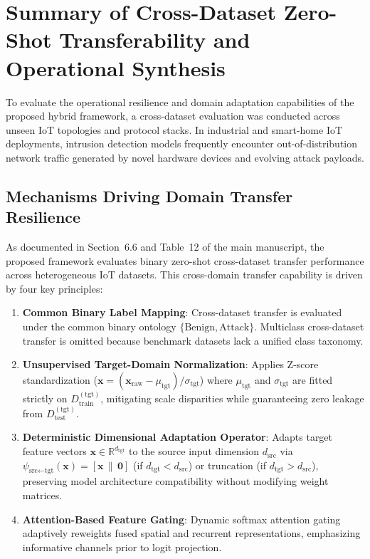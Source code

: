 \documentclass[a4paper,fleqn]{cas-sc}
\begin{document}
\section{Summary of Cross-Dataset Zero-Shot Transferability and Operational Synthesis}
\label{sec:supp_cross_dataset}

To evaluate the operational resilience and domain adaptation capabilities of the proposed hybrid framework, a cross-dataset evaluation was conducted across unseen IoT topologies and protocol stacks. In industrial and smart-home IoT deployments, intrusion detection models frequently encounter out-of-distribution network traffic generated by novel hardware devices and evolving attack payloads.

\subsection{Mechanisms Driving Domain Transfer Resilience}
As documented in Section~6.6 and Table~12 of the main manuscript, the proposed framework evaluates binary zero-shot cross-dataset transfer performance across heterogeneous IoT datasets. This cross-domain transfer capability is driven by four key principles:
\begin{enumerate}\setlength{\itemsep}{1pt}\setlength{\parskip}{0pt}
    \item \textbf{Common Binary Label Mapping}: Cross-dataset transfer is evaluated under the common binary ontology $\{\text{Benign}, \text{Attack}\}$. Multiclass cross-dataset transfer is omitted because benchmark datasets lack a unified class taxonomy.
    \item \textbf{Unsupervised Target-Domain Normalization}: Applies Z-score standardization ($\mathbf{x} = (\mathbf{x}_{\text{raw}} - \mu_{\text{tgt}}) / \sigma_{\text{tgt}}$) where $\mu_{\text{tgt}}$ and $\sigma_{\text{tgt}}$ are fitted strictly on $D_{\text{train}}^{(\text{tgt})}$, mitigating scale disparities while guaranteeing zero leakage from $D_{\text{test}}^{(\text{tgt})}$.
    \item \textbf{Deterministic Dimensional Adaptation Operator}: Adapts target feature vectors $\mathbf{x} \in \mathbb{R}^{d_{\text{tgt}}}$ to the source input dimension $d_{\text{src}}$ via $\psi_{\text{src} \leftarrow \text{tgt}}(\mathbf{x}) = \left[ \mathbf{x} \,\|\, \mathbf{0} \right]$ (if $d_{\text{tgt}} < d_{\text{src}}$) or truncation (if $d_{\text{tgt}} > d_{\text{src}}$), preserving model architecture compatibility without modifying weight matrices.
    \item \textbf{Attention-Based Feature Gating}: Dynamic softmax attention gating adaptively reweights fused spatial and recurrent representations, emphasizing informative channels prior to logit projection.
\end{enumerate}
\end{document}

